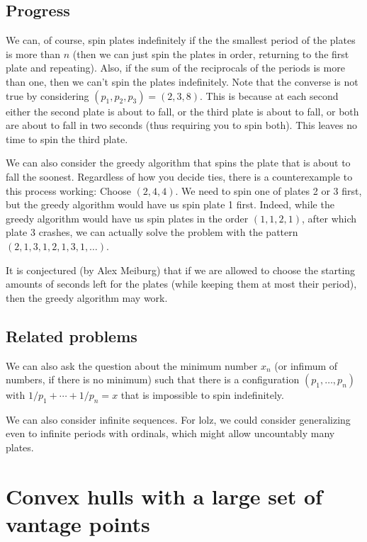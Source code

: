 \documentclass[10pt]{article}
\begin{document}
\subsection{Progress}

We can, of course, spin plates indefinitely if the the smallest period of the plates is more than $n$ (then we can just spin the plates in order, returning to the first plate and repeating). Also, if the sum of the reciprocals of the periods is more than one, then we can't spin the plates indefinitely. Note that the converse is not true by considering $(p_1,p_2,p_3)=(2,3,8)$. This is because at each second either the second plate is about to fall, or the third plate is about to fall, or both are about to fall in two seconds (thus requiring you to spin both). This leaves no time to spin the third plate.

We can also consider the greedy algorithm that spins the plate that is about to fall the soonest. Regardless of how you decide ties, there is a counterexample to this process working: Choose $(2,4,4)$. We need to spin one of plates 2 or 3 first, but the greedy algorithm would have us spin plate 1 first. Indeed, while the greedy algorithm would have us spin plates in the order $(1,1,2,1)$, after which plate 3 crashes, we can actually solve the problem with the pattern $(2,1,3,1,2,1,3,1,\ldots)$.

It is conjectured (by Alex Meiburg) that if we are allowed to choose the starting amounts of seconds left for the plates (while keeping them at most their period), then the greedy algorithm may work.

\subsection{Related problems}

We can also ask the question about the minimum number $x_n$ (or infimum of numbers, if there is no minimum) such that there is a configuration $(p_1,\ldots,p_n)$ with $1/p_1+\cdots+1/p_n=x$ that is impossible to spin indefinitely.

We can also consider infinite sequences. For lolz, we could consider generalizing even to infinite periods with ordinals, which might allow uncountably many plates.

\pagebreak

\section{Convex hulls with a large set of vantage points}
\end{document}
